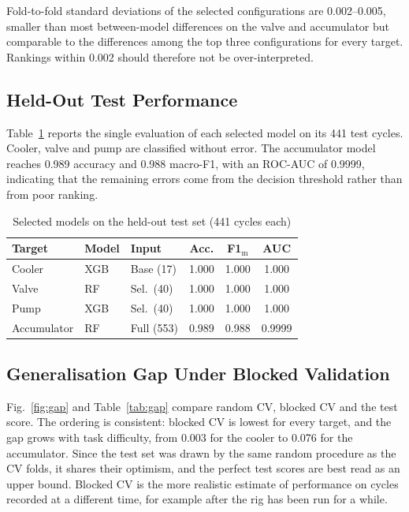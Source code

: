 \documentclass[conference]{IEEEtran}
\begin{document}
Fold-to-fold standard deviations of the selected configurations are
0.002--0.005, smaller than most between-model differences on the valve and
accumulator but comparable to the differences among the top three
configurations for every target. Rankings within 0.002 should therefore not be
over-interpreted.

\subsection{Held-Out Test Performance}
Table~\ref{tab:test} reports the single evaluation of each selected model on
its 441 test cycles. Cooler, valve and pump are classified without error. The
accumulator model reaches 0.989 accuracy and 0.988 macro-F1, with an ROC-AUC
of 0.9999, indicating that the remaining errors come from the decision
threshold rather than from poor ranking.

\begin{table}[t]
\centering
\caption{Selected models on the held-out test set (441 cycles each)}
\label{tab:test}
\begin{tabular}{@{}lllccc@{}}
\toprule
Target & Model & Input & Acc. & F1$_{\text{m}}$ & AUC \\
\midrule
Cooler & XGB & Base (17) & 1.000 & 1.000 & 1.000 \\
Valve & RF & Sel.\ (40) & 1.000 & 1.000 & 1.000 \\
Pump & XGB & Sel.\ (40) & 1.000 & 1.000 & 1.000 \\
Accumulator & RF & Full (553) & 0.989 & 0.988 & 0.9999 \\
\bottomrule
\end{tabular}
\end{table}

\subsection{Generalisation Gap Under Blocked Validation}
Fig.~\ref{fig:gap} and Table~\ref{tab:gap} compare random CV, blocked CV and
the test score. The ordering is consistent: blocked CV is lowest for every
target, and the gap grows with task difficulty, from 0.003 for the cooler to
0.076 for the accumulator. Since the test set was drawn by the same random
procedure as the CV folds, it shares their optimism, and the perfect test
scores are best read as an upper bound. Blocked CV is the more realistic
estimate of performance on cycles recorded at a different time, for example
after the rig has been run for a while.
\end{document}
